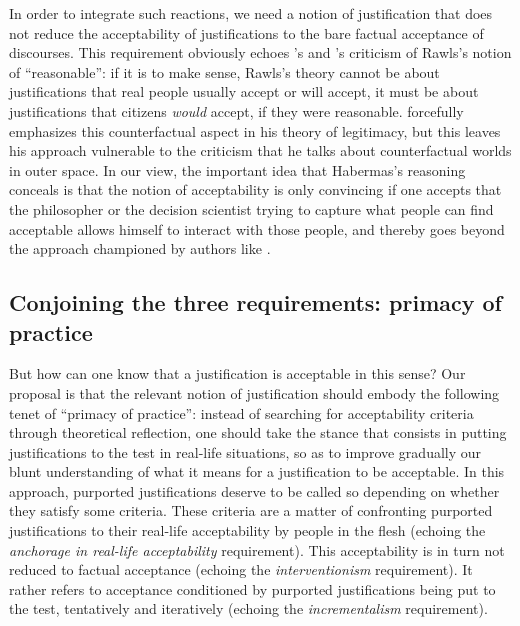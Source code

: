 \documentclass[preprint, french, english, 11pt, authoryear]{elsarticle}%
\newcommand{\possessivecite}[1]{\citeauthor{#1}'s \citeyearpar{#1}}
\begin{document}
In order to integrate such reactions, we need a notion of justification that does not reduce the acceptability of justifications to the bare factual acceptance of discourses. This requirement obviously echoes \possessivecite{habermas_reconciliation_1995} and \possessivecite{estlund_democratic_2009} criticism of Rawls's notion of “reasonable”: if it is to make sense, Rawls's theory cannot be about justifications that real people usually accept or will accept, it must be about justifications that citizens \emph{would} accept, if they were reasonable. \citet{habermas_faktizitat_1992} forcefully emphasizes this counterfactual aspect in his theory of legitimacy, but this leaves his approach vulnerable to the criticism that he talks about counterfactual worlds in outer space. In our view, the important idea that Habermas's reasoning conceals is that the notion of acceptability is only convincing if one accepts that the philosopher or the decision scientist trying to capture what people can find acceptable allows himself to interact with those people, and thereby goes beyond the approach championed by authors like \cite{boltanski_justification_2006}.


\subsection{Conjoining the three requirements: primacy of practice}
But how can one know that a justification is acceptable in this sense? %
Our proposal is that the relevant notion of justification should embody the following tenet of “primacy of practice”: instead of searching for acceptability criteria through theoretical reflection, one should take the stance that consists in putting justifications to the test in real-life situations, so as to improve gradually our blunt understanding of what it means for a justification to be acceptable. In this approach, purported justifications deserve to be called so depending on whether they satisfy some criteria. These criteria are a matter of confronting purported justifications to their real-life acceptability by people in the flesh (echoing the \emph{anchorage in real-life acceptability} requirement). This acceptability is in turn not reduced to factual acceptance (echoing the \emph{interventionism} requirement). It rather refers to acceptance conditioned by purported justifications being put to the test, tentatively and iteratively (echoing the \emph{incrementalism} requirement).
\end{document}
